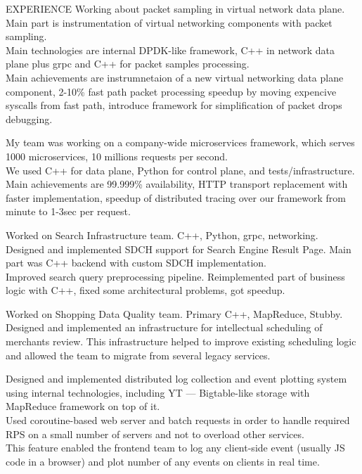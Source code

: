 \documentclass[12pt]{cutecv}
\begin{document}
\begin{paracol}{2}
\begin{leftcolumn}
\end{leftcolumn}

\begin{rightcolumn}
\begin{cvsection}{EXPERIENCE}
  {Working about packet sampling in virtual network data plane. Main part is instrumentation of virtual
  networking components with packet sampling. \\
  Main technologies are internal DPDK-like framework, C++ in network data plane plus grpc and C++ for packet samples processing. \\
  Main achievements are instrumnetaion of a new virtual networking data plane component,
  2-10\% fast path packet processing speedup by moving expencive syscalls from fast path, introduce framework for 
  simplification of packet drops debugging.}
  
  {My team was working on a company-wide microservices framework, which serves
  1000 microservices, 10 millions requests per second.\\
  We used C++ for data plane, Python for control plane, and tests/infrastructure.\\
  Main achievements are 99.999\% availability, HTTP transport replacement
  with faster implementation, speedup of distributed tracing over our
  framework from minute to 1-3sec per request.}

  {Worked on Search Infrastructure team. C++, Python, grpc, networking.
  Designed and implemented SDCH support for Search Engine Result Page.
  Main part was C++ backend with custom SDCH implementation.\\
  Improved search query preprocessing pipeline. Reimplemented part of business logic with C++, fixed some architectural problems, got speedup.}
  
  {Worked on Shopping Data Quality team. Primary C++, MapReduce, Stubby.
   Designed and implemented an infrastructure for intellectual scheduling of merchants review. This infrastructure helped to improve existing scheduling logic
   and allowed the team to migrate from several legacy services.}
  
  {Designed and implemented distributed log collection and event
   plotting system using internal technologies, including YT — Bigtable-like
   storage with MapReduce framework on top of it. \\
   Used coroutine-based web server and batch requests in order
   to handle required RPS on a small number of servers and not to overload
   other services. \\
   This feature enabled the frontend team to log any client-side
   event (usually JS code in a browser) and plot number of any events on
   clients in real time.}


\end{cvsection}
\end{rightcolumn}
\end{paracol}
\end{document}
